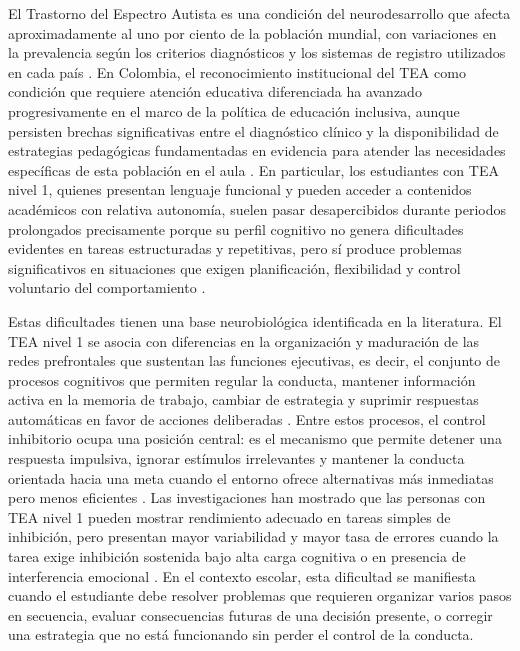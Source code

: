 \documentclass{book}
\begin{document}
El Trastorno del Espectro Autista es una condición del 
neurodesarrollo que afecta aproximadamente al uno por ciento 
de la población mundial, con variaciones en la prevalencia 
según los criterios diagnósticos y los sistemas de registro 
utilizados en cada país \cite{Lord2018, APA2022}. En Colombia, 
el reconocimiento institucional del TEA como condición que 
requiere atención educativa diferenciada ha avanzado 
progresivamente en el marco de la política de educación 
inclusiva, aunque persisten brechas significativas entre 
el diagnóstico clínico y la disponibilidad de estrategias 
pedagógicas fundamentadas en evidencia para atender las 
necesidades específicas de esta población en el aula 
\cite{Hirota2023}. En particular, los estudiantes con TEA 
nivel 1, quienes presentan lenguaje funcional y pueden 
acceder a contenidos académicos con relativa autonomía, 
suelen pasar desapercibidos durante periodos prolongados 
precisamente porque su perfil cognitivo no genera 
dificultades evidentes en tareas estructuradas y 
repetitivas, pero sí produce problemas significativos 
en situaciones que exigen planificación, flexibilidad 
y control voluntario del comportamiento 
\cite{APA2022, Happe2020}.

Estas dificultades tienen una base neurobiológica 
identificada en la literatura. El TEA nivel 1 se asocia 
con diferencias en la organización y maduración de las 
redes prefrontales que sustentan las funciones ejecutivas, 
es decir, el conjunto de procesos cognitivos que permiten 
regular la conducta, mantener información activa en la 
memoria de trabajo, cambiar de estrategia y suprimir 
respuestas automáticas en favor de acciones deliberadas 
\cite{Diamond2013, Hill2004}. Entre estos procesos, 
el control inhibitorio ocupa una posición central: 
es el mecanismo que permite detener una respuesta 
impulsiva, ignorar estímulos irrelevantes y mantener 
la conducta orientada hacia una meta cuando el entorno 
ofrece alternativas más inmediatas pero menos eficientes 
\cite{Diamond2013, Miyake2000}. Las investigaciones han 
mostrado que las personas con TEA nivel 1 pueden mostrar 
rendimiento adecuado en tareas simples de inhibición, 
pero presentan mayor variabilidad y mayor tasa de errores 
cuando la tarea exige inhibición sostenida bajo alta 
carga cognitiva o en presencia de interferencia emocional 
\cite{Geurts2009, Hill2004}. En el contexto escolar, 
esta dificultad se manifiesta cuando el estudiante debe 
resolver problemas que requieren organizar varios pasos 
en secuencia, evaluar consecuencias futuras de una 
decisión presente, o corregir una estrategia que no 
está funcionando sin perder el control de la conducta.
\end{document}
